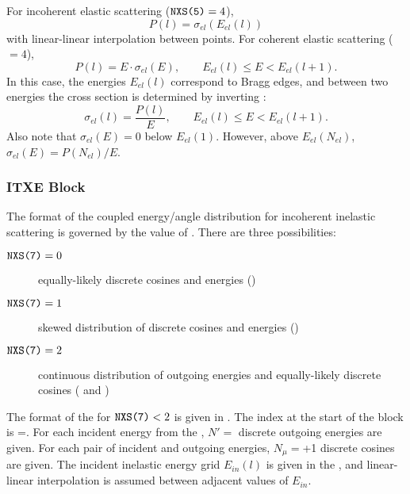 For incoherent elastic scattering ($\texttt{NXS(5)}=4$),
\begin{equation}
  P(l) = \sigma_{el}(E_{el}(l))
\end{equation}
with linear-linear interpolation between points. For coherent elastic scattering ($=4$),
\begin{equation}
  P(l) = E\cdot\sigma_{el}(E), \qquad E_{el}(l) \le E < E_{el}(l+1).
  \label{eq:CoherentP}
\end{equation}
In this case, the energies $E_{el}(l)$ correspond to Bragg edges, and between two energies the cross section is determined by inverting :
\begin{equation}
  \sigma_{el}(l) = \frac{P(l)}{E}, \qquad E_{el}(l) \le E < E_{el}(l+1).
\end{equation}
Also note that $\sigma_{el}(E)=0$ below $E_{el}(1)$. However, above $E_{el}(N_{el})$, $\sigma_{el}(E) = P(N_{el})/E$.

\subsubsection{\textsf{ITXE} Block}\label{sec:ITXEBlock}

The format of the coupled energy/angle distribution for incoherent inelastic scattering is governed by the value of . There are three possibilities:
\begin{description}
  \item[$\texttt{NXS(7)}=0$] equally-likely discrete cosines and energies ()
  \item[$\texttt{NXS(7)}=1$] skewed distribution of discrete cosines and energies ()
  \item[$\texttt{NXS(7)}=2$] continuous distribution of outgoing energies and equally-likely discrete cosines ( and )
\end{description}

The format of the  for $\texttt{NXS(7)}<2$ is given in . The index at the start of the block is =. For each incident energy from the , $N'=$ discrete outgoing energies are given. For each pair of incident and outgoing energies, $N_\mu=$+1 discrete cosines are given. The incident inelastic energy grid $E_{in}(l)$ is given in the , and linear-linear interpolation is assumed between adjacent values of $E_{in}$.

